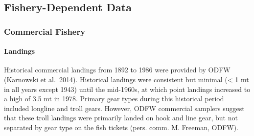 \documentclass[11pt,
  english,
  a4paper,
]{article}
\begin{document}

\hypertarget{fishery-dependent-data}{%
\subsection{Fishery-Dependent Data}\label{fishery-dependent-data}}

\leavevmode\tagmcend\tagstructend


\hypertarget{commercial-fishery}{%
\subsubsection{Commercial Fishery}\label{commercial-fishery}}

\leavevmode\tagmcend\tagstructend


\hypertarget{landings}{%
\paragraph{Landings}\label{landings}}

\leavevmode\tagmcend\tagstructend


Historical commercial landings from 1892 to 1986 were provided by ODFW (Karnowski et al.~2014). Historical landings were consistent but minimal (\textless{} 1 mt in all years except 1943) until the mid-1960s, at which point landings increased to a high of 3.5 mt in 1978. Primary gear types during this historical period included longline and troll gears. However, ODFW commercial samplers suggest that these troll landings were primarily landed on hook and line gear, but not separated by gear type on the fish tickets (pers. comm. M. Freeman, ODFW).

\leavevmode\tagmcend\tagstructend\par

\end{document}
